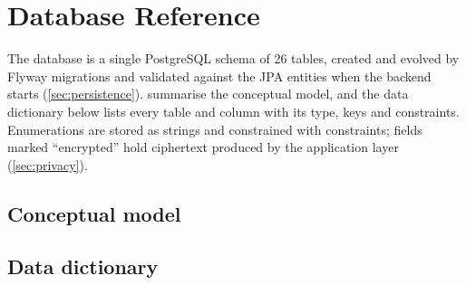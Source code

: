 \chapter{Database Reference}\label{app:database}

The \ProjectName{} database is a single PostgreSQL schema of 26 tables, created and evolved by
Flyway migrations and validated against the JPA entities when the backend starts
(\cref{sec:persistence}).  summarise the conceptual model, and the
data dictionary below lists every table and column with its type, keys and constraints. Enumerations are
stored as strings and constrained with  constraints; fields marked ``encrypted'' hold
ciphertext produced by the application layer (\cref{sec:privacy}).

\section{Conceptual model}

\section{Data dictionary}

